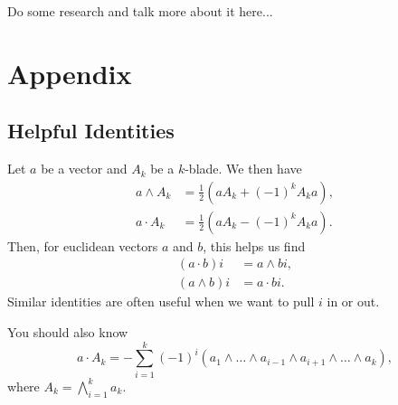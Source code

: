 \documentclass[12pt]{article}
\begin{document}
Do some research and talk more about it here...

\section*{Appendix}

\subsection*{Helpful Identities}

Let $a$ be a vector and $A_k$ be a $k$-blade.  We then have
\begin{align*}
a\wedge A_k &= \frac{1}{2}\left(aA_k + (-1)^kA_ka\right), \\
a\cdot A_k &= \frac{1}{2}\left(aA_k - (-1)^kA_ka\right).
\end{align*}
Then, for euclidean vectors $a$ and $b$, this helps us find
\begin{align*}
(a\cdot b)i &= a\wedge bi, \\
(a\wedge b)i &= a\cdot bi.
\end{align*}
Similar identities are often useful when we want to pull $i$ in or out.

You should also know
\begin{equation*}
a\cdot A_k = -\sum_{i=1}^k(-1)^i (a_1\wedge\dots\wedge a_{i-1}\wedge a_{i+1}\wedge\dots\wedge a_k),
\end{equation*}
where $A_k=\bigwedge_{i=1}^k a_k$.
\end{document}
